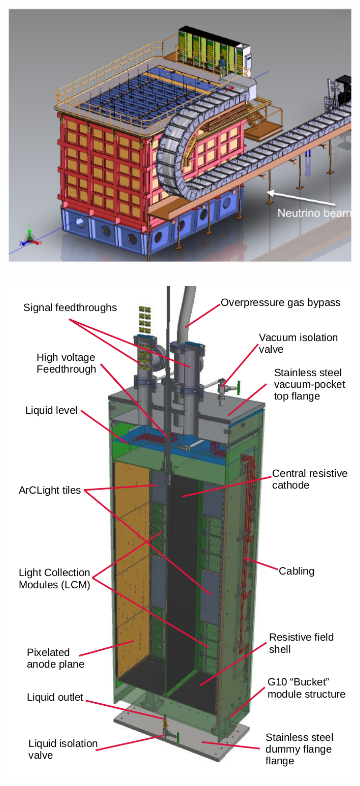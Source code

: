 \begin{figure}[!t]
     \centering
     \begin{subfigure}[b]{0.59\textwidth}
         \centering
         \includegraphics[width=\textwidth]{figures/ch3-DUNE/ND-LAr.jpg}
         \caption{}
         \label{fig:NDLAr}
     \end{subfigure}
     \begin{subfigure}[b]{0.39\textwidth}
         \centering
         \includegraphics[width=\textwidth]{figures/ch3-DUNE/ND-LAr_module.png}

\end{subfigure}
\end{figure}
